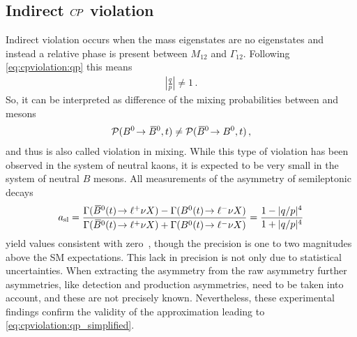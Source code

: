 
\subsection{Indirect \texorpdfstring{${C\!P}$}{CP} violation}
\label{sec:cpviolation:types:indirect}

Indirect \CP violation occurs when the mass eigenstates are no \CP eigenstates
and instead a relative phase is present between $M_{12}$ and $\Gamma_{12}$.
Following \cref{eq:cpviolation:qp} this means
\begin{align}
	\left|\frac qp \right| \neq 1\,.
\end{align}
So, it can be interpreted as difference of the mixing probabilities between
\Bd and \Bdb mesons
\begin{align}
	\mathcal{P}({{B}^0}\!\rightarrow{\ensuremath{{\kern 0.18em\overline{\kern -0.18em B}{}}{}^0}},t) \neq \mathcal{P}({{\kern 0.18em\overline{\kern -0.18em B}{}}{}^0}\!\rightarrow{\ensuremath{{B}^0}},t)\,,
\end{align}
and thus is also called \CP violation in mixing. While this type of \CP
violation has been observed in the system of neutral kaons, it is expected to
be very small in the system of neutral $B$ mesons. All measurements of the asymmetry of semileptonic decays
\begin{align}
	a_{\mathrm{sl}} = \frac{\Gamma({{\kern 0.18em\overline{\kern -0.18em B}{}}{}^0}(t)\!\rightarrow{\ensuremath{\ell^+}}\nu X) - \Gamma({{B}^0}(t)\!\rightarrow{\ensuremath{\ell^-}}\nu X)}{\Gamma({{\kern 0.18em\overline{\kern -0.18em B}{}}{}^0}(t)\!\rightarrow{\ensuremath{\ell^+}}\nu X) + \Gamma({{B}^0}(t)\!\rightarrow{\ensuremath{\ell^-}}\nu X)} = \frac{1 - |q/p|^4}{1 + |q/p|^4}
\end{align}
yield values consistent with
zero~\cite{LHCb-PAPER-2014-053,LHCb-PAPER-2016-013}, though the precision is
one to two magnitudes above the SM expectations. This lack in precision is not
only due to statistical uncertainties. When extracting the \CP asymmetry from
the raw asymmetry further asymmetries, like detection and production
asymmetries, need to be taken into account, and these are not precisely known.
Nevertheless, these experimental findings confirm the validity of the
approximation leading to \cref{eq:cpviolation:qp_simplified}.